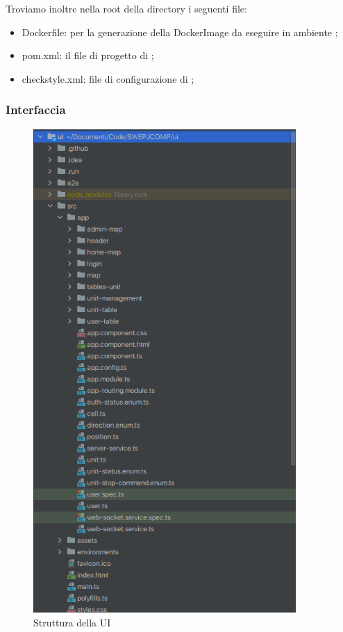 	Troviamo inoltre nella root della directory i seguenti file:
	\begin{itemize}
		\item{Dockerfile}: per la generazione della DockerImage da eseguire in ambiente ;
		\item{pom.xml}: il file di progetto di ;
		\item{checkstyle.xml}: file di configurazione di ;
	\end{itemize}

\newpage

	\subsubsection{Interfaccia}

	\begin{figure}[H]
		\centering
		\includegraphics[width=10cm]{img/struttura_ui.png}
		\caption{Struttura della UI}
	\end{figure}

